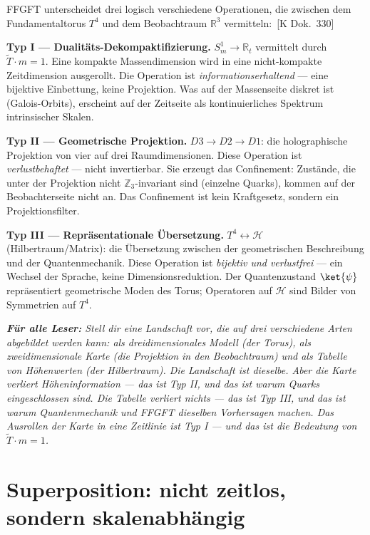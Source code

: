 \documentclass[11pt,oneside]{book}
\newcommand{\status}[1]{\penalty10000\,{\scriptsize\textcolor{gray!60}{[#1]}}}
\newenvironment{laierspur}{%
  \par\vspace{4pt}%
  \noindent\small\itshape\color{blue!60!black}%
  \textbf{Für alle Leser:}\enspace\ignorespaces}{%
  \par\vspace{4pt}\normalsize\normalfont\normalcolor}
\begin{document}
FFGFT unterscheidet drei logisch verschiedene Operationen, die zwischen
dem Fundamentaltorus $T^4$ und dem Beobachtraum $\mathbb{R}^3$ vermitteln:
\status{K Dok.~330}

\textbf{Typ I — Dualitäts-Dekompaktifizierung.}
$S^1_m \to \mathbb{R}_t$ vermittelt durch $\tilde{T}\cdot m = 1$.
Eine kompakte Massendimension wird in eine nicht-kompakte Zeitdimension
ausgerollt. Die Operation ist \textit{informationserhaltend} — eine
bijektive Einbettung, keine Projektion. Was auf der Massenseite diskret
ist (Galois-Orbits), erscheint auf der Zeitseite als kontinuierliches
Spektrum intrinsischer Skalen.

\textbf{Typ II — Geometrische Projektion.}
$D3 \to D2 \to D1$: die holographische Projektion von vier auf drei
Raumdimensionen. Diese Operation ist \textit{verlustbehaftet} — nicht
invertierbar. Sie erzeugt das Confinement: Zustände, die unter der
Projektion nicht $\mathbb{Z}_3$-invariant sind (einzelne Quarks), kommen
auf der Beobachterseite nicht an. Das Confinement ist kein Kraftgesetz,
sondern ein Projektionsfilter.

\textbf{Typ III — Repräsentationale Übersetzung.}
$T^4 \leftrightarrow \mathcal{H}$ (Hilbertraum/Matrix): die Übersetzung
zwischen der geometrischen Beschreibung und der Quantenmechanik. Diese
Operation ist \textit{bijektiv und verlustfrei} — ein Wechsel der Sprache,
keine Dimensionsreduktion. Der Quantenzustand $\ket{\psi}$ repräsentiert
geometrische Moden des Torus; Operatoren auf $\mathcal{H}$ sind Bilder
von Symmetrien auf $T^4$.

\begin{laierspur}
Stell dir eine Landschaft vor, die auf drei verschiedene Arten abgebildet
werden kann: als dreidimensionales Modell (der Torus), als zweidimensionale
Karte (die Projektion in den Beobachtraum) und als Tabelle von Höhenwerten
(der Hilbertraum). Die Landschaft ist dieselbe. Aber die Karte verliert
Höheninformation — das ist Typ II, und das ist warum Quarks eingeschlossen
sind. Die Tabelle verliert nichts — das ist Typ III, und das ist warum
Quantenmechanik und FFGFT dieselben Vorhersagen machen. Das Ausrollen
der Karte in eine Zeitlinie ist Typ I — und das ist die Bedeutung von
$\tilde{T}\cdot m = 1$.
\end{laierspur}

\section*{Superposition: nicht zeitlos, sondern skalenabhängig}
\end{document}
